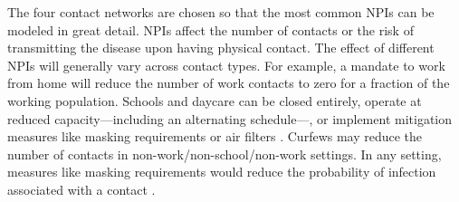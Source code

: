 The four contact networks are chosen so that the most common NPIs can be modeled in great
detail. NPIs affect the number of contacts or the risk of transmitting the disease upon
having physical contact. The effect of different NPIs will generally vary across contact
types. For example, a mandate to work from home will
reduce the number of work contacts to zero for a fraction of the working population.
Schools and daycare can be closed entirely, operate at reduced capacity---including an
alternating schedule---, or implement mitigation measures like masking requirements or
air filters \citep{Lessler2021}. Curfews may reduce the number of contacts in
non-work/non-school/non-work settings. In any setting, measures like masking requirements
would reduce the probability of infection associated with a contact \citep{Cheng2021}.

